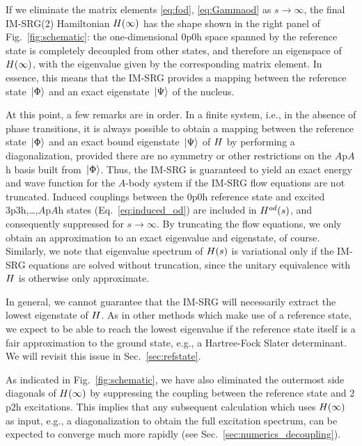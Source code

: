 If we eliminate the matrix elements \eqref{eq:fod}, \eqref{eq:Gammaod} as $s\to\infty$, the final IM-SRG(2) 
Hamiltonian $H(\infty)$ has the shape shown in the right panel of Fig.~\ref{fig:schematic}: the 
one-dimensional $0$p$0$h space spanned by the reference state is completely decoupled from other 
states, and therefore an eigenspace of $H(\infty)$, with the eigenvalue given by the corresponding 
matrix element. In essence, this means that the IM-SRG provides a mapping between the reference 
state $\,|{\Phi}\rangle$ and an exact eigenstate $\,|{\Psi}\rangle$ of the nucleus. 

At this point, a few remarks are in order. In a finite system, i.e., in the absence of phase transitions, 
it is always possible to obtain a mapping between the reference state $\,|{\Phi}\rangle$ and an exact bound 
eigenstate $\,|{\Psi}\rangle$ of $H$ by performing a diagonalization, provided there are no symmetry or other 
restrictions on the $A$p$A$h basis built from $\,|{\Phi}\rangle$. Thus, the IM-SRG is guaranteed to yield an 
exact energy and wave function for the $A$-body system if the IM-SRG flow equations are not truncated. 
Induced couplings between the 0p0h reference state and excited 3p3h,\ldots,$A$p$A$h states 
(Eq.~\eqref{eq:induced_od}) are included in $H^{od}(s)$, and consequently suppressed for $s\to\infty$. 
By truncating the flow equations, we only obtain an approximation to an exact eigenvalue and eigenstate, 
of course. Similarly, we note that eigenvalue spectrum of $H(s)$ is variational only if the IM-SRG equations are solved without truncation, since the unitary equivalence with $H$ is otherwise only approximate. 

In general, we cannot guarantee that the IM-SRG will necessarily extract the lowest eigenstate 
of $H$. As in other methods which make use of a reference state, we expect to be able to reach 
the lowest eigenvalue if the reference state itself is a fair approximation to the ground state, e.g., 
a Hartree-Fock Slater determinant. We will revisit this issue in Sec.~\ref{sec:refstate}.

As indicated in Fig.~\ref{fig:schematic}, we have also eliminated the outermost side diagonals of 
$H(\infty)$ by suppressing the coupling between the reference state and $2$p$2$h excitations. This 
implies that any subsequent calculation which uses $H(\infty)$ as input, e.g., a diagonalization to 
obtain the full excitation spectrum, can be expected to converge much more rapidly (see 
Sec.~\ref{sec:numerics_decoupling}). 

